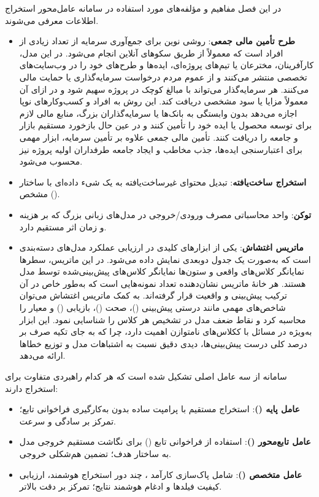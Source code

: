 

در این فصل مفاهیم و مؤلفه‌های مورد استفاده در سامانه عامل‌محور استخراج اطلاعات معرفی می‌شوند.


\begin{itemize}
\item \textbf{طرح تأمین مالی جمعی}: روشی نوین برای جمع‌آوری سرمایه از تعداد زیادی از افراد است که معمولاً از طریق سکو‌های آنلاین انجام می‌شود. در این مدل، کارآفرینان، مخترعان یا تیم‌های پروژه‌ای، ایده‌ها و طرح‌های خود را در وب‌سایت‌های تخصصی منتشر می‌کنند و از عموم مردم درخواست سرمایه‌گذاری یا حمایت مالی می‌کنند. هر سرمایه‌گذار می‌تواند با مبالغ کوچک در پروژه سهیم شود و در ازای آن معمولاً مزایا یا سود مشخصی دریافت کند. این روش به افراد و کسب‌وکارهای نوپا اجازه می‌دهد بدون وابستگی به بانک‌ها یا سرمایه‌گذاران بزرگ، منابع مالی لازم برای توسعه محصول یا ایده خود را تأمین کنند و در عین حال بازخورد مستقیم بازار و جامعه را دریافت کنند. تأمین مالی جمعی علاوه بر تأمین سرمایه، ابزار مهمی برای اعتبارسنجی ایده‌ها، جذب مخاطب و ایجاد جامعه طرفداران اولیه پروژه نیز محسوب می‌شود.


\item \textbf{استخراج ساخت‌یافته}: تبدیل محتوای  غیرساخت‌یافته به یک شیء داد‌ه‌ای با ساختار مشخص ().

\item \textbf{توکن}: واحد محاسباتی مصرف ورودی/خروجی در مدل‌های زبانی بزرگ که بر هزینه و زمان اثر مستقیم دارد.

\item \textbf{ماتریس اغتشاش}: یکی از ابزارهای کلیدی در ارزیابی عملکرد مدل‌های دسته‌بندی است که به‌صورت یک جدول دوبعدی نمایش داده می‌شود. در این ماتریس، سطرها نمایانگر کلاس‌های واقعی و ستون‌ها نمایانگر کلاس‌های پیش‌بینی‌شده توسط مدل هستند. هر خانهٔ ماتریس نشان‌دهنده تعداد نمونه‌هایی است که به‌طور خاص در آن ترکیب پیش‌بینی و واقعیت قرار گرفته‌اند. به کمک ماتریس اغتشاش می‌توان شاخص‌های مهمی مانند درستی پیش‌بینی ()، صحت ()، بازیابی ()  و  معیار را محاسبه کرد و نقاط ضعف مدل در تشخیص هر کلاس را شناسایی نمود. این ابزار به‌ویژه در مسائل با ککلاس‌های نامتوازن اهمیت دارد، چرا که به جای تکیه صرف بر درصد کلی درست پیش‌بینی‌ها، دیدی دقیق نسبت به اشتباهات مدل و توزیع خطاها ارائه می‌دهد.
\end{itemize}



سامانه از سه عامل اصلی تشکیل شده است که هر کدام راهبردی متفاوت برای استخراج دارند:
\begin{itemize}
\item \textbf{عامل پایه ()}: استخراج مستقیم با پرامپت ساده بدون به‌کارگیری فراخوانی تابع؛ تمرکز بر سادگی و سرعت.
\item \textbf{عامل تابع‌محور ()}: استفاده از فراخوانی تابع () برای نگاشت مستقیم خروجی مدل به ساختار هدف؛ تضمین هم‌شکلی خروجی.
\item \textbf{عامل متخصص ()}: شامل پاک‌سازی کارآمد ، چند دور استخراج هوشمند، ارزیابی کیفیت فیلدها و ادغام هوشمند نتایج؛ تمرکز بر دقت بالاتر.
\end{itemize}

